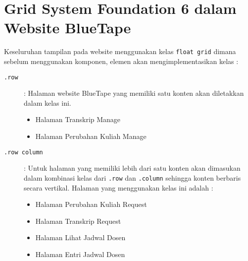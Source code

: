 \section{Grid System Foundation 6 dalam Website BlueTape}
Keseluruhan tampilan pada website menggunakan kelas \texttt{float grid} dimana sebelum menggunakan komponen, elemen akan mengimplementasikan kelas :
\begin{description}
	\item [\texttt{.row}] : Halaman website BlueTape yang memiliki satu konten akan diletakkan dalam kelas ini.
	\begin{itemize}
		\item Halaman Transkrip Manage
		\item Halaman Perubahan Kuliah Manage
	\end{itemize}
	\item [\texttt{.row column}] : Untuk halaman yang memiliki lebih dari satu konten akan dimasukan dalam kombinasi kelas dari \texttt{.row} dan \texttt{.column} sehingga konten berbaris secara vertikal.  Halaman yang menggunakan kelas ini adalah :
	\begin{itemize}
		\item Halaman Perubahan Kuliah Request
		\item Halaman Transkrip Request
		\item Halaman Lihat Jadwal Dosen
		\item Halaman Entri Jadwal Dosen
	\end{itemize}	
	 	 
\end{description}

